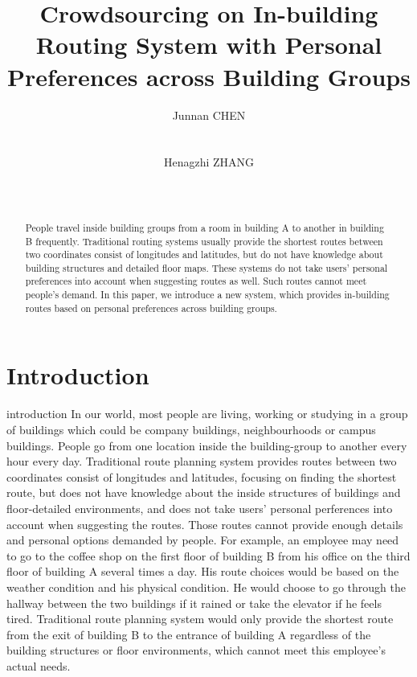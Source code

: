\documentclass{sigchi}
\begin{document}
\title{Crowdsourcing on In-building Routing System with Personal Preferences across Building Groups}

\author{
  \alignauthor Junnan CHEN\\
    \\
    \\
  \alignauthor Henagzhi ZHANG\\
    \\
    \\
}

\maketitle

\begin{abstract}
People travel inside building groups from a room in building A to another in building B frequently. Traditional routing systems usually provide the shortest routes between two coordinates consist of longitudes and latitudes, but do not have knowledge about building structures and detailed floor maps. These systems do not take users' personal preferences into account when suggesting routes as well. Such routes cannot meet people’s demand. In this paper, we introduce a new system, which provides in-building routes based on personal preferences across building groups.
\end{abstract}


\section{Introduction}

introduction
In our world, most people are living, working or studying in a group of buildings which could be company buildings, neighbourhoods or campus buildings. People go from one location inside the building-group to another every hour every day. Traditional route planning system provides routes between two coordinates consist of longitudes and latitudes, focusing on finding the shortest route, but does not have knowledge about the inside structures of buildings and floor-detailed environments, and does not take users' personal perferences into account when suggesting the routes. Those routes cannot provide enough details and personal options demanded by people.
For example, an employee may need to go to the coffee shop on the first floor of building B from his office on the third floor of building A several times a day. His route choices would be based on the weather condition and his physical condition. He would choose to go through the hallway between the two buildings if it rained or take the elevator if he feels tired. Traditional route planning system would only provide the shortest route from the exit of building B to the entrance of building A regardless of the building structures or floor environments, which cannot meet this employee's actual needs.
\end{document}
